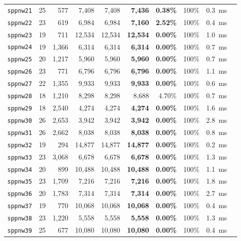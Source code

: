 \documentclass[10pt,journal,compsoc]{IEEEtran}
\begin{document}
\begin{table}[t]
\begin{tabular}{lrrrrrrrrr}
\texttt{sppnw21} & 25 & 577 & 7,408 & 7,408 & \textbf{7,436} & \textbf{0.38\%} & 100\% & 0.3~ms \\
\texttt{sppnw22} & 23 & 619 & 6,984 & 6,984 & \textbf{7,160} & \textbf{2.52\%} & 100\% & 0.4~ms \\
\texttt{sppnw23} & 19 & 711 & 12,534 & 12,534 & \textbf{12,534} & \textbf{0.00\%} & 100\% & 1.0~ms \\
\texttt{sppnw24} & 19 & 1,366 & 6,314 & 6,314 & \textbf{6,314} & \textbf{0.00\%} & 100\% & 0.7~ms \\
\texttt{sppnw25} & 20 & 1,217 & 5,960 & 5,960 & \textbf{5,960} & \textbf{0.00\%} & 100\% & 0.7~ms \\
\texttt{sppnw26} & 23 & 771 & 6,796 & 6,796 & \textbf{6,796} & \textbf{0.00\%} & 100\% & 1.1~ms \\
\texttt{sppnw27} & 22 & 1,355 & 9,933 & 9,933 & \textbf{9,933} & \textbf{0.00\%} & 100\% & 0.6~ms \\
\texttt{sppnw28} & 18 & 1,210 & 8,298 & 8,298 & 8,688 & 4.70\% & 100\% & 0.7~ms \\
\texttt{sppnw29} & 18 & 2,540 & 4,274 & 4,274 & \textbf{4,274} & \textbf{0.00\%} & 100\% & 1.6~ms \\
\texttt{sppnw30} & 26 & 2,653 & 3,942 & 3,942 & \textbf{3,942} & \textbf{0.00\%} & 100\% & 2.8~ms \\
\texttt{sppnw31} & 26 & 2,662 & 8,038 & 8,038 & \textbf{8,038} & \textbf{0.00\%} & 100\% & 0.8~ms \\
\texttt{sppnw32} & 19 & 294 & 14,877 & 14,877 & \textbf{14,877} & \textbf{0.00\%} & 100\% & 0.2~ms \\
\texttt{sppnw33} & 23 & 3,068 & 6,678 & 6,678 & \textbf{6,678} & \textbf{0.00\%} & 100\% & 1.3~ms \\
\texttt{sppnw34} & 20 & 899 & 10,488 & 10,488 & \textbf{10,488} & \textbf{0.00\%} & 100\% & 1.1~ms \\
\texttt{sppnw35} & 23 & 1,709 & 7,216 & 7,216 & \textbf{7,216} & \textbf{0.00\%} & 100\% & 1.8~ms \\
\texttt{sppnw36} & 20 & 1,783 & 7,314 & 7,314 & \textbf{7,314} & \textbf{0.00\%} & 100\% & 2.7~ms \\
\texttt{sppnw37} & 19 & 770 & 10,068 & 10,068 & \textbf{10,068} & \textbf{0.00\%} & 100\% & 0.4~ms \\
\texttt{sppnw38} & 23 & 1,220 & 5,558 & 5,558 & \textbf{5,558} & \textbf{0.00\%} & 100\% & 1.3~ms \\
\texttt{sppnw39} & 25 & 677 & 10,080 & 10,080 & \textbf{10,080} & \textbf{0.00\%} & 100\% & 0.4~ms \\

\end{tabular}
\end{table}
\end{document}
